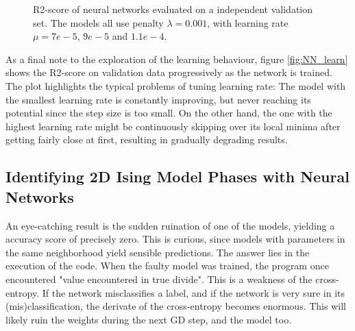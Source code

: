 \begin{figure}[H]
\centering
{}
\caption{R2-score of neural networks evaluated on a independent validation set. The models all use penalty $\lambda = 0.001$, with learning rate $\mu = 7e-5$, $9e-5$ and $1.1e-4$.}
\label{fig:NN_learn}
\end{figure}

As a final note to the exploration of the learning behaviour, figure \autoref{fig:NN_learn} shows the R2-score on validation data progressively as the network is trained. The plot highlights the typical problems of tuning learning rate: The model with the smallest learning rate is constantly improving, but never reaching its potential since the step size is too small. On the other hand, the one with the highest learning rate might be continuously skipping over its local minima after getting fairly close at first, resulting in gradually degrading results.   


\subsection{Identifying 2D Ising Model Phases with Neural Networks}\label{sec:results NN reg}


An eye-catching result is the sudden ruination of one of the models, yielding a accuracy score of precisely zero. This is curious, since models with parameters in the same neighborhood yield sensible predictions. The answer lies in the execution of the code. When the faulty model was trained, the program once encountered "value encountered in true divide". This is a weakness of the cross-entropy. If the network misclassifies a label, and if the network is very sure in its (mis)classification, the derivate of the cross-entropy becomes enormous. This will likely ruin the weights during the next GD step, and the model too.

